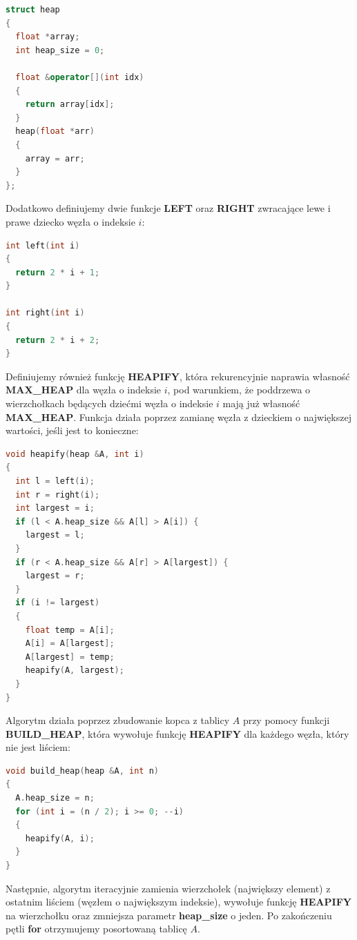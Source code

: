 \documentclass{article}
\begin{document}
\begin{lstlisting}[style=mystyle, language=C++, caption={Implementacja \texttt{Heap}}, label={lst:heap}]
struct heap
{
  float *array;
  int heap_size = 0;

  float &operator[](int idx)
  {
    return array[idx];
  }
  heap(float *arr)
  {
    array = arr;
  }
};
\end{lstlisting}
Dodatkowo definiujemy dwie funkcje \textbf{LEFT} oraz \textbf{RIGHT} zwracające lewe i prawe dziecko węzła o indeksie $i$:
\begin{lstlisting}[style=mystyle, language=C++, caption={Implementacja \texttt{Left} i \texttt{Right}}, label={lst:lr}]
int left(int i)
{
  return 2 * i + 1;
}

int right(int i)
{
  return 2 * i + 2;
}
\end{lstlisting}
Definiujemy również funkcję \textbf{HEAPIFY}, która rekurencyjnie naprawia własność \textbf{MAX\_HEAP} dla węzła o indeksie $i$, pod warunkiem, że poddrzewa o wierzchołkach będących dziećmi węzła o indeksie $i$ mają już własność \textbf{MAX\_HEAP}. Funkcja działa poprzez zamianę węzła z dzieckiem o największej wartości, jeśli jest to konieczne:
\begin{lstlisting}[style=mystyle, language=C++, caption={Implementacja \texttt{Heapify}}, label={lst:heapify}]
void heapify(heap &A, int i)
{
  int l = left(i);
  int r = right(i);
  int largest = i;
  if (l < A.heap_size && A[l] > A[i]) {
    largest = l;
  }
  if (r < A.heap_size && A[r] > A[largest]) {
    largest = r;
  }
  if (i != largest)
  {
    float temp = A[i];
    A[i] = A[largest];
    A[largest] = temp;
    heapify(A, largest);
  }
}
\end{lstlisting}
Algorytm działa poprzez zbudowanie kopca z tablicy $A$ przy pomocy funkcji \textbf{BUILD\_HEAP}, która wywołuje funkcję \textbf{HEAPIFY} dla każdego węzła, który nie jest liściem:

\begin{lstlisting}[style=mystyle, language=C++, caption={Implementacja \texttt{Build Heap}}, label={lst:buildheap}]
void build_heap(heap &A, int n)
{
  A.heap_size = n;
  for (int i = (n / 2); i >= 0; --i)
  {
    heapify(A, i);
  }
}
\end{lstlisting}

Następnie, algorytm iteracyjnie zamienia wierzchołek (największy element) z ostatnim liściem (węzłem o największym indeksie), wywołuje funkcję \textbf{HEAPIFY} na wierzchołku oraz zmniejsza parametr \textbf{heap\_size} o jeden. Po zakończeniu pętli \textbf{for} otrzymujemy posortowaną tablicę $A$.
\end{document}
